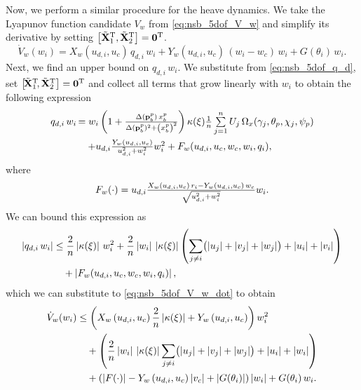 Now, we perform a similar procedure for the heave dynamics.
We take the Lyapunov function candidate $V_w$ from \eqref{eq:nsb_5dof_V_w} and simplify its derivative by setting $\left[\tilde{\mathbf{X}}_1^{\mathrm{T}}, \tilde{\mathbf{X}}_2^{\mathrm{T}}\right] = \mathbf{0}^{\mathrm{T}}$.
\begin{equation}
    \dot{V}_w(w_i) = X_w\left(u_{d,i}, u_c\right)\,q_{d,i}\,w_i + Y_w\left(u_{d,i}, u_c\right)\,\left(w_i - w_c\right)\,w_i + G(\theta_i)\,w_i. \label{eq:nsb_5dof_V_w_dot}
\end{equation}
Next, we find an upper bound on $q_{d,i}\,w_i$.
We substitute from \eqref{eq:nsb_5dof_q_d}, set $\left[\!\tilde{\mathbf{X}}_1^{\mathrm{T}}\!, \tilde{\mathbf{X}}_2^{\mathrm{T}}\right] = \mathbf{0}^{\mathrm{T}}$ and collect all terms that grow linearly with $w_i$ to obtain the following expression
\begin{align}
    \scale[1]{q_{d,i}\,w_i}\, &\scale[1]{= w_i\left(1 + \frac{\Delta(\mat{p}_b^p)\,x_b^p}{\Delta(\mat{p}_b^p)^2 + \left(x_b^p\right)^2}\right) \kappa(\xi) \frac{1}{n} \sum\limits_{j=1}^n U_j\,\Omega_x(\gamma_j, \theta_p, \chi_j, \psi_p)} \\
    & \quad \scale[1]{+ u_{d,i}\frac{Y_w(u_{d,i}, u_c)}{u_{d,i}^2 + w_i^2}w_i^2 + F_w(u_{d,i}, u_c, w_c, w_i, q_i),}
\end{align}
where
\begin{equation}
    \scale[1]{F_w(\cdot) =  u_{d,i}\frac{X_w(u_{d,i}, u_c)\,r_i - Y_w(u_{d,i}, u_c)\,w_c}{\sqrt{u_{d,i}^2 + w_i^2}} w_i.}
\end{equation}
We can bound this expression as
\begin{equation}
    \begin{split}
        \left|q_{d,i}\,w_i\right| &\leq \frac{2}{n}\left|\kappa(\xi)\right|\,w_i^2 + \frac{2}{n}\left|w_i\right|\,\left|\kappa(\xi)\right|\left(\sum_{j \neq i}\bigl(\left|u_j\right| + \left|v_j\right| + \left|w_j\right|\bigr) + \left|u_i\right| + \left|v_i\right|\right) \\
        &\quad + \left|F_w(u_{d,i}, u_c, w_c, w_i, q_i)\right|,
    \end{split}
\end{equation}
which we can substitute to \eqref{eq:nsb_5dof_V_w_dot} to obtain
\begin{equation}
    \begin{split}
        \dot{V}_w(w_i) &\leq \left(X_w\left(u_{d,i}, u_c\right)\frac{2}{n}\left|\kappa(\xi)\right| + Y_w\left(u_{d,i}, u_c\right)\right)w_i^2 \\
        & \quad + \left(\frac{2}{n}\left|w_i\right|\,\left|\kappa(\xi)\right|\sum_{j \neq i}\bigl(\left|u_j\right| + \left|v_j\right| + \left|w_j\right|\bigr) + \left|u_i\right| + \left|w_i\right|\right) \\
        & \quad + \left(\left|F(\cdot)\right| - Y_w\left(u_{d,i}, u_c\right)\left|v_c\right| + \left|G(\theta_i)\right|\right) \left|w_i\right| + G(\theta_i)\,w_i.
    \end{split}
\end{equation}
